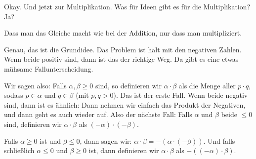 \begin{spoken-clean}[01:07:15 - 01:08:00]
Okay. Und jetzt zur Multiplikation. Was für Ideen gibt es für die Multiplikation? Ja?
\end{spoken-clean}

\begin{student-interaction}
Dass man das Gleiche macht wie bei der Addition, nur dass man multipliziert.
\end{student-interaction}

\begin{spoken-clean}[01:08:00 - 01:10:00]
Genau, das ist die Grundidee. Das Problem ist halt mit den negativen Zahlen. Wenn beide positiv sind, dann ist das der richtige Weg. Da gibt es eine etwas mühsame Fallunterscheidung.

Wir sagen also: Falls $\alpha, \beta \ge 0$ sind, so definieren wir $\alpha \cdot \beta$ als die Menge aller $p \cdot q$, sodass $p \in \alpha$ und $q \in \beta$ (mit $p, q > 0$). Das ist der erste Fall. Wenn beide negativ sind, dann ist es ähnlich: Dann nehmen wir einfach das Produkt der Negativen, und dann geht es auch wieder auf. Also der nächste Fall: Falls $\alpha$ und $\beta$ beide $\le 0$ sind, definieren wir $\alpha \cdot \beta$ als $(-\alpha) \cdot (-\beta)$.

Falls $\alpha \ge 0$ ist und $\beta \le 0$, dann sagen wir: $\alpha \cdot \beta = -(\alpha \cdot (-\beta))$. Und falls schließlich $\alpha \le 0$ und $\beta \ge 0$ ist, dann definieren wir $\alpha \cdot \beta$ als $-((-\alpha) \cdot \beta)$.
\end{spoken-clean}

